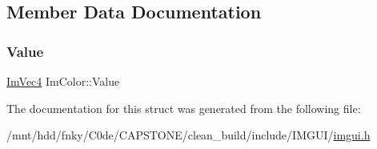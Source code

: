 \subsection{Member Data Documentation}
\mbox{\label{structImColor_a4cf43bd58e30decaa0248f839fc85e95}} 
\subsubsection{\texorpdfstring{Value}{Value}}
{\footnotesize\ttfamily \hyperlink{structImVec4}{Im\+Vec4} Im\+Color\+::\+Value}



The documentation for this struct was generated from the following file\+:\begin{DoxyCompactItemize}
\item 
/mnt/hdd/fnky/\+C0de/\+C\+A\+P\+S\+T\+O\+N\+E/clean\+\_\+build/include/\+I\+M\+G\+U\+I/\hyperlink{imgui_8h}{imgui.\+h}\end{DoxyCompactItemize}
